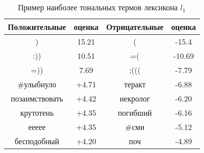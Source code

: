 \begin{table}[htp!]
\centering
\caption{Пример наиболее тональных термов лексикона $l_1$}
\label{table:rubtsova_lexicon}
\begin{tabular}{cccc}
\hline
\multicolumn{1}{c|}{Положительные}& \multicolumn{1}{c|}{оценка} & \multicolumn{1}{c|}{Отрицательные} & оценка \\ \hline
)                     & 15.21 & (       & -15.4  \\
:))                   & 10.51 & =(       & -10.69 \\
=))                   & 7.69  & ;(((     & -7.79  \\
\#улыбнуло            & +4.71 & теракт   & -6.88  \\
позаимствовать        & +4.42 & некролог &  -6.20 \\
крутотень             & +4.35 & погибший &  -6.16 \\
еееее                 & +4.35 & \#сми    &  -5.12 \\
бесподобный           & +4.20 & поч      &  -4.89 \\ \hline
\end{tabular}
\end{table}
